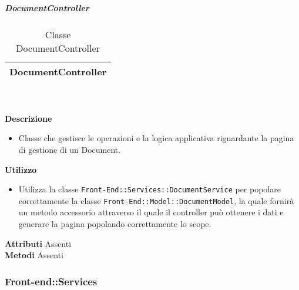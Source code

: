 			\subparagraph{DocumentController} 
\begin{table}[ht]
\begin{center}
\bgroup
	\setlength{\arrayrulewidth}{0.6mm}
	\def\arraystretch{1}
		\begin{tabular}{ | p{12cm} | }
				\hline  
					\centerline{\textbf{DocumentController}}
		\\ \hline 
				\hline
				\hline
		
		\end{tabular}
\egroup
\caption{Classe DocumentController}
\end{center}
\end{table} \textbf{\\ \\ Descrizione}
\begin{itemize}
\item[] Classe che gestisce le operazioni e la logica applicativa riguardante la pagina di gestione di un Document.
\end{itemize} 
\textbf{Utilizzo}
\begin{itemize}
\item[] Utilizza la classe \texttt{Front-End::Services::DocumentService} per popolare correttamente la classe \texttt{Front-End::Model::DocumentModel}, la quale fornirà un metodo accessorio attraverso il quale il controller può ottenere i dati e generare la pagina popolando correttamente lo scope.
\end{itemize}
\textbf{Attributi}
Assenti \\
\textbf{Metodi}
Assenti \\

	\subsubsection{Front-end::Services} 
